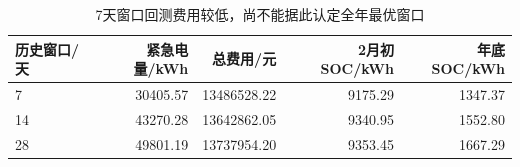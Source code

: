 \begin{table}[H]
\centering\small
\caption{7天窗口回测费用较低，尚不能据此认定全年最优窗口}
\label{tab:window}
\begin{tabular}{lrrrr}\toprule
历史窗口/天 & 紧急电量/kWh & 总费用/元 & 2月初SOC/kWh & 年底SOC/kWh \\\midrule
7 & 30405.57 & 13486528.22 & 9175.29 & 1347.37 \\
14 & 43270.28 & 13642862.05 & 9340.95 & 1552.80 \\
28 & 49801.19 & 13737954.20 & 9353.45 & 1667.29 \\
\bottomrule\end{tabular}
\end{table}
